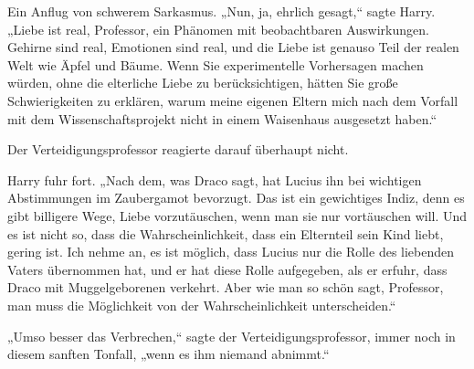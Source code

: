 Ein Anflug von schwerem Sarkasmus. „Nun, ja, ehrlich gesagt,“ sagte Harry. „Liebe ist real, Professor, ein Phänomen mit beobachtbaren Auswirkungen. Gehirne sind real, Emotionen sind real, und die Liebe ist genauso Teil der realen Welt wie Äpfel und Bäume. Wenn Sie experimentelle Vorhersagen machen würden, ohne die elterliche Liebe zu berücksichtigen, hätten Sie große Schwierigkeiten zu erklären, warum meine eigenen Eltern mich nach dem Vorfall mit dem Wissenschaftsprojekt nicht in einem Waisenhaus ausgesetzt haben.“

Der Verteidigungsprofessor reagierte darauf überhaupt nicht.

Harry fuhr fort. „Nach dem, was Draco sagt, hat Lucius ihn bei wichtigen Abstimmungen im Zaubergamot bevorzugt. Das ist ein gewichtiges Indiz, denn es gibt billigere Wege, Liebe vorzutäuschen, wenn man sie nur vortäuschen will. Und es ist nicht so, dass die Wahrscheinlichkeit, dass ein Elternteil sein Kind liebt, gering ist. Ich nehme an, es ist möglich, dass Lucius nur die Rolle des liebenden Vaters übernommen hat, und er hat diese Rolle aufgegeben, als er erfuhr, dass Draco mit Muggelgeborenen verkehrt. Aber wie man so schön sagt, Professor, man muss die Möglichkeit von der Wahrscheinlichkeit unterscheiden.“

„Umso besser das Verbrechen,“ sagte der Verteidigungsprofessor, immer noch in diesem sanften Tonfall, „wenn es ihm niemand abnimmt.“


